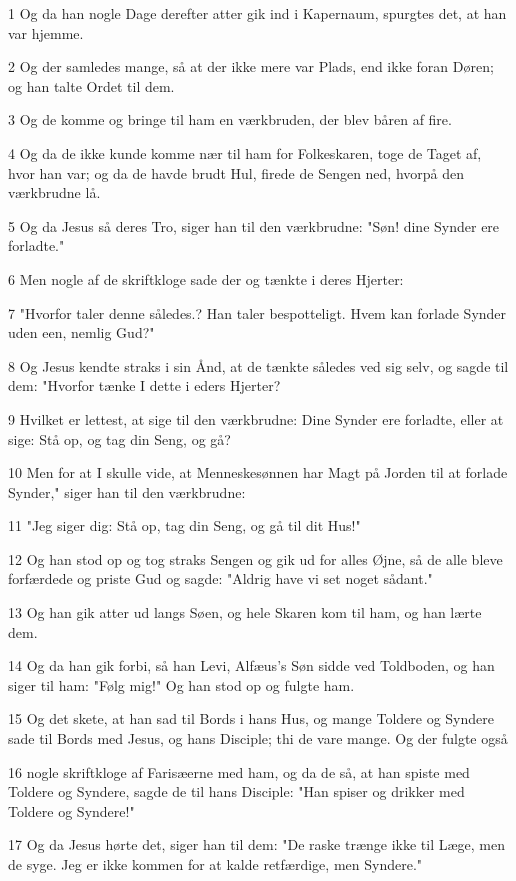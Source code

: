 \par 1 Og da han nogle Dage derefter atter gik ind i Kapernaum, spurgtes det, at han var hjemme.
\par 2 Og der samledes mange, så at der ikke mere var Plads, end ikke foran Døren; og han talte Ordet til dem.
\par 3 Og de komme og bringe til ham en værkbruden, der blev båren af fire.
\par 4 Og da de ikke kunde komme nær til ham for Folkeskaren, toge de Taget af, hvor han var; og da de havde brudt Hul, firede de Sengen ned, hvorpå den værkbrudne lå.
\par 5 Og da Jesus så deres Tro, siger han til den værkbrudne: "Søn! dine Synder ere forladte."
\par 6 Men nogle af de skriftkloge sade der og tænkte i deres Hjerter:
\par 7 "Hvorfor taler denne således.? Han taler bespotteligt. Hvem kan forlade Synder uden een, nemlig Gud?"
\par 8 Og Jesus kendte straks i sin Ånd, at de tænkte således ved sig selv, og sagde til dem: "Hvorfor tænke I dette i eders Hjerter?
\par 9 Hvilket er lettest, at sige til den værkbrudne: Dine Synder ere forladte, eller at sige: Stå op, og tag din Seng, og gå?
\par 10 Men for at I skulle vide, at Menneskesønnen har Magt på Jorden til at forlade Synder," siger han til den værkbrudne:
\par 11 "Jeg siger dig: Stå op, tag din Seng, og gå til dit Hus!"
\par 12 Og han stod op og tog straks Sengen og gik ud for alles Øjne, så de alle bleve forfærdede og priste Gud og sagde: "Aldrig have vi set noget sådant."
\par 13 Og han gik atter ud langs Søen, og hele Skaren kom til ham, og han lærte dem.
\par 14 Og da han gik forbi, så han Levi, Alfæus's Søn sidde ved Toldboden, og han siger til ham: "Følg mig!" Og han stod op og fulgte ham.
\par 15 Og det skete, at han sad til Bords i hans Hus, og mange Toldere og Syndere sade til Bords med Jesus, og hans Disciple; thi de vare mange. Og der fulgte også
\par 16 nogle skriftkloge af Farisæerne med ham, og da de så, at han spiste med Toldere og Syndere, sagde de til hans Disciple: "Han spiser og drikker med Toldere og Syndere!"
\par 17 Og da Jesus hørte det, siger han til dem: "De raske trænge ikke til Læge, men de syge. Jeg er ikke kommen for at kalde retfærdige, men Syndere."
